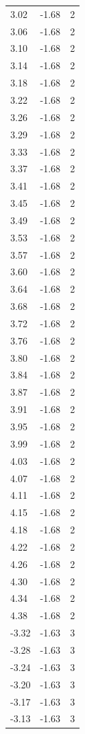\begin{longtable}{lrr}
  3.02 & -1.68 & 2 \\
  3.06 & -1.68 & 2 \\
  3.10 & -1.68 & 2 \\
  3.14 & -1.68 & 2 \\
  3.18 & -1.68 & 2 \\
  3.22 & -1.68 & 2 \\
  3.26 & -1.68 & 2 \\
  3.29 & -1.68 & 2 \\
  3.33 & -1.68 & 2 \\
  3.37 & -1.68 & 2 \\
  3.41 & -1.68 & 2 \\
  3.45 & -1.68 & 2 \\
  3.49 & -1.68 & 2 \\
  3.53 & -1.68 & 2 \\
  3.57 & -1.68 & 2 \\
  3.60 & -1.68 & 2 \\
  3.64 & -1.68 & 2 \\
  3.68 & -1.68 & 2 \\
  3.72 & -1.68 & 2 \\
  3.76 & -1.68 & 2 \\
  3.80 & -1.68 & 2 \\
  3.84 & -1.68 & 2 \\
  3.87 & -1.68 & 2 \\
  3.91 & -1.68 & 2 \\
  3.95 & -1.68 & 2 \\
  3.99 & -1.68 & 2 \\
  4.03 & -1.68 & 2 \\
  4.07 & -1.68 & 2 \\
  4.11 & -1.68 & 2 \\
  4.15 & -1.68 & 2 \\
  4.18 & -1.68 & 2 \\
  4.22 & -1.68 & 2 \\
  4.26 & -1.68 & 2 \\
  4.30 & -1.68 & 2 \\
  4.34 & -1.68 & 2 \\
  4.38 & -1.68 & 2 \\
  -3.32 & -1.63 & 3 \\
  -3.28 & -1.63 & 3 \\
  -3.24 & -1.63 & 3 \\
  -3.20 & -1.63 & 3 \\
  -3.17 & -1.63 & 3 \\
  -3.13 & -1.63 & 3 \\

\end{longtable}
